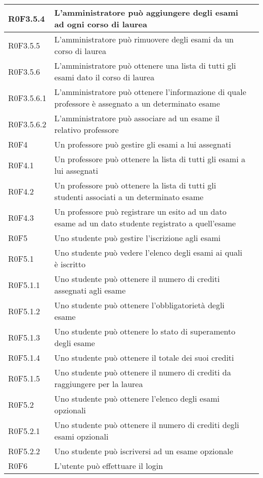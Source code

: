 \documentclass[AnalisiDeiRequisiti.tex]{subfiles}
\begin{document}
\begin{longtable}[H]{|p{2cm}|p{5cm}|p{5cm}|}
	R0F3.5.4 &  L'amministratore può aggiungere degli esami ad ogni corso di laurea &  \\ \hline
	R0F3.5.5 &  L'amministratore può rimuovere degli esami da un corso di laurea &  \\ \hline
	R0F3.5.6 &  L'amministratore può ottenere una lista di tutti gli esami dato il corso di laurea &  \\ \hline
	R0F3.5.6.1 &  L'amministratore può ottenere l'informazione di quale professore è assegnato a un determinato esame &  \\ \hline
	R0F3.5.6.2  &  L'amministratore può associare ad un esame il relativo professore &  \\ \hline
	R0F4 &  Un professore può gestire gli esami a lui assegnati &  \\ \hline
	R0F4.1 &  Un professore può ottenere la lista di tutti gli esami a lui assegnati &  \\ \hline
	R0F4.2 &  Un professore può ottenere la lista di tutti gli studenti associati a un determinato esame &  \\ \hline
	R0F4.3 &  Un professore può registrare un esito ad un dato esame ad un dato studente registrato a quell'esame &  \\ \hline
	R0F5 &  Uno studente può gestire l'iscrizione agli esami &  \\ \hline
	R0F5.1 &  Uno studente può vedere l'elenco degli esami ai quali è iscritto &  \\ \hline
	R0F5.1.1 &  Uno studente può ottenere il numero di crediti assegnati agli esame &  \\ \hline
	R0F5.1.2 &  Uno studente può ottenere l'obbligatorietà degli esame &  \\ \hline
	R0F5.1.3 &  Uno studente può ottenere lo stato di superamento degli esame &  \\ \hline
	R0F5.1.4 &  Uno studente può ottenere il totale dei suoi crediti &  \\ \hline
	R0F5.1.5 &  Uno studente può ottenere il numero di crediti da raggiungere per la laurea &  \\ \hline
	R0F5.2 &  Uno studente può ottenere l'elenco degli esami opzionali &  \\ \hline
	R0F5.2.1 &  Uno studente può ottenere il numero di crediti degli esami opzionali &  \\ \hline
	R0F5.2.2 &  Uno studente può iscriversi ad un esame opzionale &  \\ \hline
	R0F6 &  L'utente può effettuare il login &  \\ \hline

\end{longtable}
\end{document}
